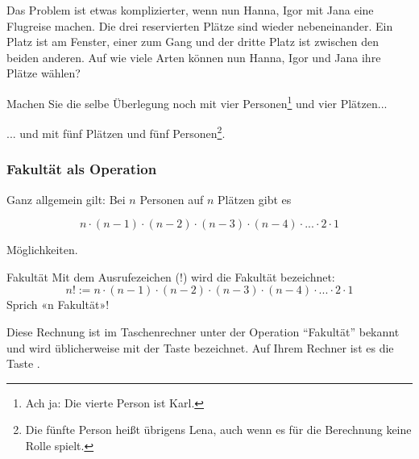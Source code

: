 
Das Problem ist etwas komplizierter, wenn nun Hanna, Igor mit Jana
eine Flugreise machen. Die drei reservierten Plätze sind wieder
nebeneinander. Ein Platz ist am Fenster, einer zum Gang und der dritte
Platz ist zwischen den beiden anderen. Auf wie viele Arten können nun
Hanna, Igor und Jana ihre Plätze wählen?


Machen Sie die selbe Überlegung noch mit vier Personen\footnote{Ach ja: Die vierte Person ist Karl.} und vier
Plätzen...



... und mit fünf Plätzen und fünf Personen\footnote{Die fünfte Person heißt übrigens Lena, auch wenn es für die Berechnung keine Rolle spielt.}.

\newpage


\subsubsection{Fakultät als Operation}

Ganz allgemein gilt: Bei $n$ Personen auf $n$ Plätzen gibt es

$$n\cdot{} (n-1) \cdot{} (n-2) \cdot{} (n-3) \cdot{} (n-4) \cdot{}
... \cdot{} 2 \cdot{} 1$$

Möglichkeiten.

\begin{definition}{Fakultät}{}
  Mit dem Ausrufezeichen ($!$) wird die Fakultät bezeichnet:
  $$n! := n\cdot{}(n-1) \cdot{} (n-2) \cdot{} (n-3) \cdot{} (n-4) \cdot{}
  ... \cdot{} 2 \cdot{} 1$$
  Sprich «n Fakultät»!
  \end{definition}

Diese Rechnung ist im Taschenrechner unter der Operation ``Fakultät''
bekannt und wird üblicherweise mit der Taste  bezeichnet. Auf
Ihrem Rechner ist es die Taste .

